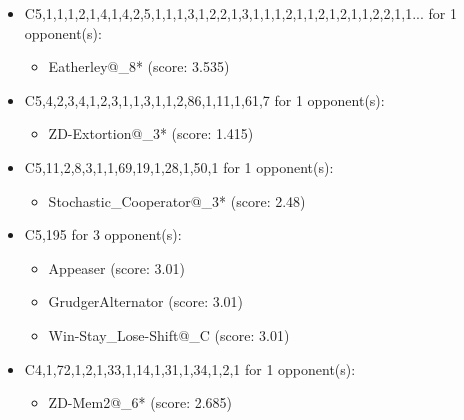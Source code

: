 \begin{appendices}
\begin{itemize}
    \item C5,1,1,1,2,1,4,1,4,2,5,1,1,1,3,1,2,2,1,3,1,1,1,2,1,1,2,1,2,1,1,2,2,1,1... for 1 opponent(s):
    \begin{multicols}{3}
         \begin{itemize}
            \item Eatherley@\_8* (score: 3.535)
        \end{itemize}
     \end{multicols}
     
    \item C5,4,2,3,4,1,2,3,1,1,3,1,1,2,86,1,11,1,61,7 for 1 opponent(s):
    \begin{multicols}{3}
         \begin{itemize}
            \item ZD-Extortion@\_3* (score: 1.415)
        \end{itemize}
     \end{multicols}
     
    \item C5,11,2,8,3,1,1,69,19,1,28,1,50,1 for 1 opponent(s):
    \begin{multicols}{3}
         \begin{itemize}
            \item Stochastic\_Cooperator@\_3* (score: 2.48)
        \end{itemize}
     \end{multicols}
     
    \item C5,195 for 3 opponent(s):
    \begin{multicols}{3}
         \begin{itemize}
            \item Appeaser (score: 3.01)
            \item GrudgerAlternator (score: 3.01)
            \item Win-Stay\_Lose-Shift@\_C (score: 3.01)
        \end{itemize}
     \end{multicols}
     
    \item C4,1,72,1,2,1,33,1,14,1,31,1,34,1,2,1 for 1 opponent(s):
    \begin{multicols}{3}
         \begin{itemize}
            \item ZD-Mem2@\_6* (score: 2.685)
        \end{itemize}
     \end{multicols}
     

\end{itemize}
\end{appendices}
